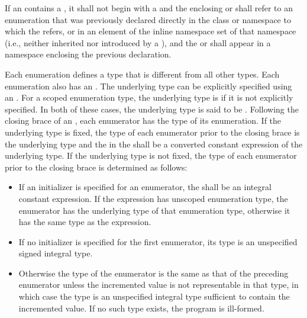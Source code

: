 \pnum
If an  contains a
,
it shall not begin with a  and
the enclosing 
or  shall
refer to an enumeration that was previously declared directly in the class or
namespace to which the  refers,
or in an element of the inline namespace
set of that namespace (i.e., neither
inherited nor introduced by a ), and the
 or 
shall appear in a namespace enclosing the previous
declaration.

\pnum
{}%
%
Each enumeration defines a type that is different from all other types.
Each enumeration also has an .
The underlying type can be explicitly specified using an .
For a scoped enumeration type, the underlying type is  if it is not
explicitly specified. In both of these cases, the underlying type is said to be
.
Following the closing brace of an , each
enumerator has the type of its enumeration.
If the underlying type is fixed, the type of each enumerator
prior to the closing brace is the underlying
type
and the  in the 
shall be a converted constant expression of the underlying
type.
If the underlying
type is not fixed,
the type of each enumerator prior to the closing brace is determined as
follows:

\begin{itemize}
\item If an
initializer is specified for an enumerator, the
 shall be an integral constant
expression. If the expression has
unscoped enumeration type, the enumerator has the underlying type of that
enumeration type, otherwise it has the same type as the expression.

\item If no initializer is specified for the
first enumerator, its type is an unspecified signed integral type.

\item  Otherwise
the type of the enumerator is the same as that of the
preceding enumerator unless the incremented value is not representable
in that type, in which case the type is an unspecified integral type
sufficient to contain the incremented value. If no such type exists, the program
is ill-formed.
\end{itemize}

